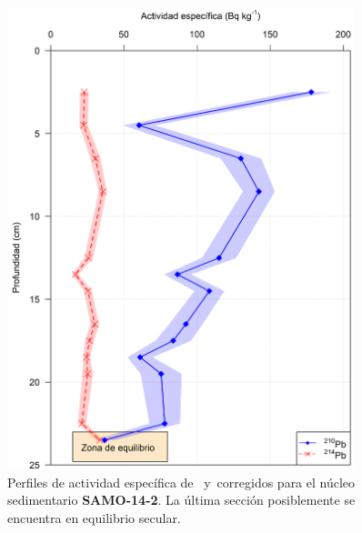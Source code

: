 \begin{figure}
\centering
\includegraphics[width=0.9\textwidth]{Imagenes/Act_210Pb_214Pb_SAMO-14-2.png}
\caption{Perfiles de actividad específica de \PbCero\, y \PbCuatro\,corregidos para el núcleo sedimentario \textbf{SAMO-14-2}. La última sección posiblemente se encuentra en equilibrio secular.}\label{Fig-SAMO142-Comp}
\end{figure}
